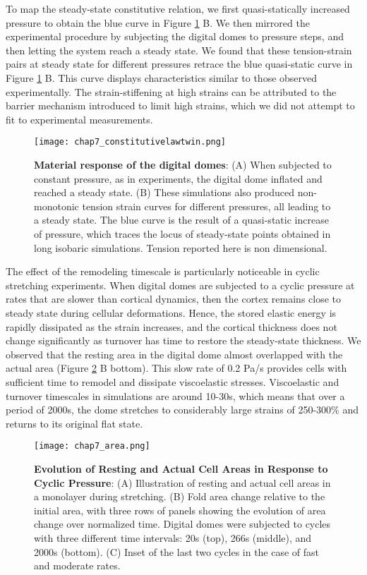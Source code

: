 To map the steady-state constitutive relation, we first quasi-statically increased pressure to obtain the blue curve in Figure \ref{fig_7_7} B. We then  mirrored the experimental procedure by subjecting the digital domes to pressure steps, and then letting the system reach a steady state. We found that these tension-strain pairs at steady state for different pressures retrace the blue quasi-static curve in Figure \ref{fig_7_7} B. This curve displays characteristics similar to those observed experimentally. The strain-stiffening at high strains can be attributed to the barrier mechanism introduced to limit high strains, which we did not attempt to fit to experimental measurements. 


\begin{figure}[]
	\centering
	\texttt{[image: chap7\_constitutivelawtwin.png]}
	\caption{\label{fig_7_7} \textbf{Material response of the digital domes}: (A) When subjected to constant pressure, as in experiments, the digital dome inflated and reached a steady state. (B) These simulations also produced non-monotonic tension strain curves for different pressures, all leading to a steady state. The blue curve is the result of a quasi-static increase of pressure, which traces the locus of steady-state points obtained in long isobaric simulations. Tension reported here is non dimensional.}
\end{figure}

The effect of the remodeling timescale is particularly noticeable in cyclic stretching experiments. When digital domes are subjected to a cyclic pressure at rates that are slower than cortical dynamics, then the cortex remains close to steady state during cellular deformations. Hence, the stored elastic energy is rapidly dissipated as the strain increases, and the cortical thickness does not change significantly as turnover has time to restore the steady-state thickness. We observed that the resting area in the digital dome almost overlapped with the actual area (Figure \ref{fig_7_8} B bottom). This slow rate of 0.2 Pa/s provides cells with sufficient time to remodel and dissipate viscoelastic stresses. Viscoelastic and turnover timescales in simulations are around 10-30s, which means that over a period of 2000s, the dome stretches to considerably large strains of 250-300\% and returns to its original flat state.


\begin{figure}
	\centering
	\texttt{[image: chap7\_area.png]}
	\caption{\label{fig_7_8} \textbf{Evolution of Resting and Actual Cell Areas in Response to Cyclic Pressure}: (A) Illustration of resting and actual cell areas in a monolayer during stretching. (B) Fold area change relative to the initial area, with three rows of panels showing the evolution of area change over normalized time. Digital domes were subjected to cycles with three different time intervals: 20s (top), 266s (middle), and 2000s (bottom). (C) Inset of the last two cycles in the case of fast and moderate rates.
	}
\end{figure}


